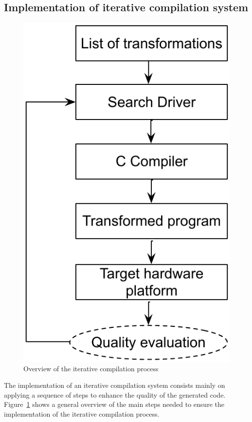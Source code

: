 
\subsection{Implementation of iterative compilation system}
\begin{figure}[h]
	\center
	\includegraphics[scale=0.8]{SOTA/fig/iterative_compilation}
	\caption{Overview of the iterative compilation process}
	\label{fig:iterative_compilation}
\end{figure}
The implementation of an iterative compilation system consists mainly on applying a sequence of steps to enhance the quality of the generated code. Figure~\ref{fig:iterative_compilation} shows a general overview of the main steps needed to ensure the implementation of the iterative compilation process.
